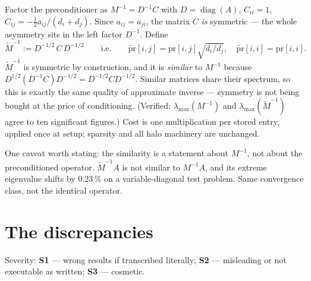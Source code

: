 \documentclass[11pt,a4paper]{article}
\newcommand{\Mi}{M^{-1}}
\newcommand{\Mt}{\widetilde{M}^{-1}}
\newcommand{\sev}[1]{\textbf{#1}}
\begin{document}
Factor the preconditioner as $\Mi=D^{-1}C$ with $D=\operatorname{diag}(A)$, $C_{ii}=1$,
$C_{ij}=-\tfrac12 a_{ij}/(d_i+d_j)$. Since $a_{ij}=a_{ji}$, the matrix $C$ \emph{is}
symmetric --- the whole asymmetry sits in the left factor $D^{-1}$. Define
\begin{equation}
  \Mt := D^{-1/2}\,C\,D^{-1/2}
  \qquad\text{i.e.}\qquad
  \widetilde{\mathrm{pr}}[i,j]=\mathrm{pr}[i,j]\sqrt{d_i/d_j},
  \quad \widetilde{\mathrm{pr}}[i,i]=\mathrm{pr}[i,i].
\end{equation}
$\Mt$ is symmetric by construction, and it is \emph{similar} to $\Mi$ because
$D^{1/2}(D^{-1}C)D^{-1/2}=D^{-1/2}CD^{-1/2}$. Similar matrices share their spectrum, so
this is exactly the same quality of approximate inverse --- symmetry is not being bought
at the price of conditioning. (Verified: $\lambda_{\max}(\Mi)$ and $\lambda_{\max}(\Mt)$
agree to ten significant figures.) Cost is one multiplication per stored entry, applied
once at setup; sparsity and all halo machinery are unchanged.

One caveat worth stating: the similarity is a statement about $\Mi$, not about the
preconditioned operator. $\Mt A$ is not similar to $\Mi A$, and its extreme eigenvalue
shifts by $0.23\,\%$ on a variable-diagonal test problem. Same convergence class, not the
identical operator.

\section{The discrepancies}
\label{sec:table}

Severity: \sev{S1} --- wrong results if transcribed literally; \sev{S2} --- misleading or
not executable as written; \sev{S3} --- cosmetic.
\end{document}
